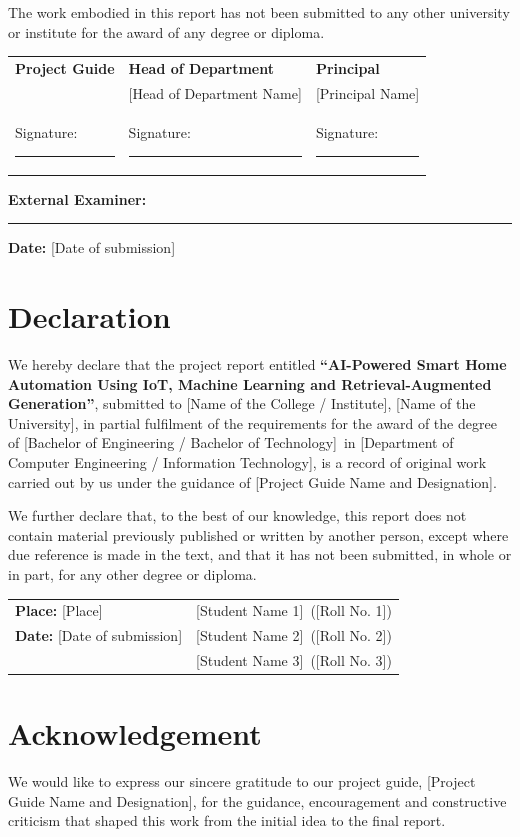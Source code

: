 \documentclass[12pt,a4paper,oneside]{report}
\newcommand{\ProjectTitle}{AI-Powered Smart Home Automation Using IoT, Machine Learning and Retrieval-Augmented Generation}
\newcommand{\StudentOne}{[Student Name 1]}
\newcommand{\RollOne}{[Roll No. 1]}
\newcommand{\StudentTwo}{[Student Name 2]}
\newcommand{\RollTwo}{[Roll No. 2]}
\newcommand{\StudentThree}{[Student Name 3]}
\newcommand{\RollThree}{[Roll No. 3]}
\newcommand{\GuideName}{[Project Guide Name and Designation]}
\newcommand{\HODName}{[Head of Department Name]}
\newcommand{\PrincipalName}{[Principal Name]}
\newcommand{\Department}{[Department of Computer Engineering / Information Technology]}
\newcommand{\College}{[Name of the College / Institute]}
\newcommand{\University}{[Name of the University]}
\newcommand{\Degree}{[Bachelor of Engineering / Bachelor of Technology]}
\newcommand{\Place}{[Place]}
\newcommand{\SubmissionDate}{[Date of submission]}
\begin{document}
The work embodied in this report has not been submitted to any other university or institute for the award of any degree or diploma.

\vspace{2.2cm}
\begin{tabularx}{\textwidth}{XXX}
\textbf{Project Guide} & \textbf{Head of Department} & \textbf{Principal}\\[0.2cm]
\GuideName & \HODName & \PrincipalName\\[1.4cm]
Signature: \rule{3cm}{0.4pt} & Signature: \rule{3cm}{0.4pt} & Signature: \rule{3cm}{0.4pt}
\end{tabularx}

\vspace{1.4cm}
\textbf{External Examiner:} \rule{5cm}{0.4pt}\hfill \textbf{Date:} \SubmissionDate

\chapter*{Declaration}
We hereby declare that the project report entitled \textbf{``\ProjectTitle''}, submitted to \College, \University, in partial fulfilment of the requirements for the award of the degree of \Degree\ in \Department, is a record of original work carried out by us under the guidance of \GuideName.

We further declare that, to the best of our knowledge, this report does not contain material previously published or written by another person, except where due reference is made in the text, and that it has not been submitted, in whole or in part, for any other degree or diploma.

\vspace{1.5cm}
\begin{tabularx}{\textwidth}{Xl}
\textbf{Place:} \Place & \StudentOne\ (\RollOne)\\[0.4cm]
\textbf{Date:} \SubmissionDate & \StudentTwo\ (\RollTwo)\\[0.4cm]
 & \StudentThree\ (\RollThree)
\end{tabularx}

\chapter*{Acknowledgement}
We would like to express our sincere gratitude to our project guide, \GuideName, for the guidance, encouragement and constructive criticism that shaped this work from the initial idea to the final report.
\end{document}
